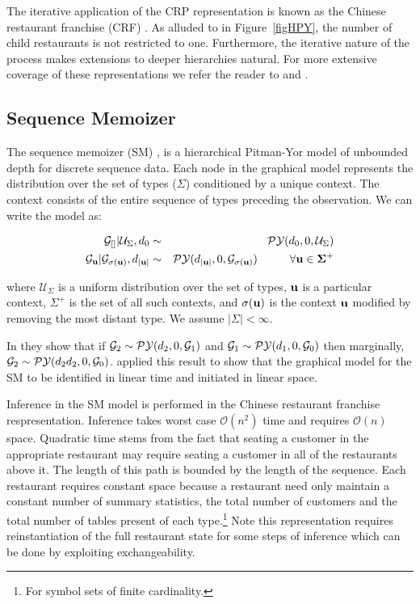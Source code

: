 The iterative application of the CRP representation is known as the Chinese restaurant franchise (CRF) \cite{teh hdp paper}.  As alluded to in Figure~\ref{figHPY}, the number of child restaurants is not restricted to one.  Furthermore, the iterative nature of the process makes extensions to deeper hierarchies natural.  For more extensive coverage of these representations we refer the reader to \cite{teh hpp} and \cite{teh hpy for langmodel}.

\subsection{Sequence Memoizer}

The sequence memoizer (SM) \cite{wood}, is a hierarchical Pitman-Yor model of unbounded depth for discrete sequence data.  Each node in the graphical model represents the distribution over the set of types ($\Sigma$) conditioned by a unique context.  The context consists of the entire sequence of types preceding the observation.  We can write the model as:

\begin{eqnarray*}
	\G_{[]} | \mathcal{U}_{\Sigma}, d_0 &\sim& \PY(d_0, 0, \mathcal{U}_{\Sigma }) \\
	\G_{\bf{u}} | \G_{\sigma(\bf{u})}, d_{|\bf{u}|} &\sim& \PY(d_{|\bf{u}|}, 0, \G_{\sigma(\bf{u})}) \hspace{1cm} \forall \bf{u} \in \Sigma^+
\end{eqnarray*}

where $\mathcal{U}_{\Sigma }$ is a uniform distribution over the set of types, $\bf{u}$ is a particular context, $\Sigma^+$ is the set of all such contexts, and $\sigma(\bf{u})$ is the context $\bf{u}$ modified by removing the most distant type.  We assume $| \Sigma | < \infty$.

In \cite{pitman} they show that  if $\G_2 \sim \PY(d_2, 0, \G_1)$ and  $\G_1 \sim \PY(d_1, 0, \G_0)$ then marginally, $\G_2 \sim \PY(d_2 d_2, 0, \G_0)$.  \cite{wood} applied this result to show that the graphical model for the SM to be identified in linear time and initiated in linear space.

Inference in the SM model is performed in the Chinese restaurant franchise respresentation. Inference takes worst case $\mathcal{O}(n^2)$ time and requires $\mathcal{O}(n)$ space. Quadratic time stems from the fact that seating a customer in the appropriate restaurant may require seating a customer in all of the restaurants above it.  The length of this path is bounded by the length of the sequence. Each restaurant requires constant space because a restaurant need only maintain a constant number of summary statistics, the total number of customers and the total number of tables present of each type.\footnote{For symbol sets of finite cardinality.} Note this representation requires reinstantiation of the full restaurant state for some steps of inference which can be done by exploiting exchangeability.
